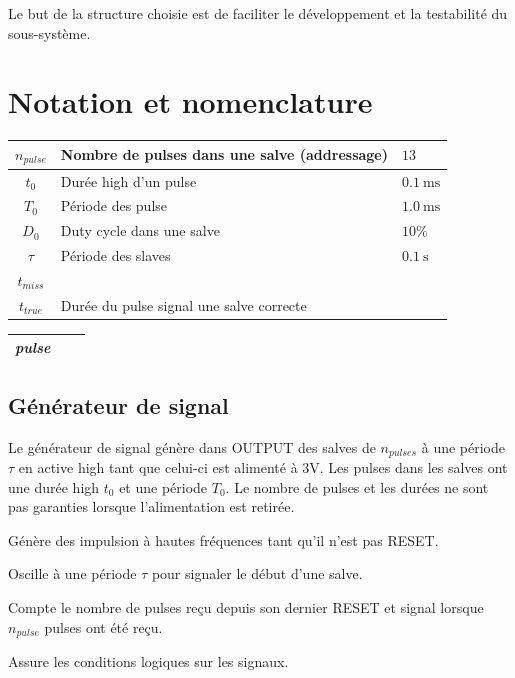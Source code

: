 \documentclass[french]{layout/Report}
\begin{document}
Le but de la structure choisie est de faciliter le développement et la testabilité
du sous-système.



\section{Notation et nomenclature}

\begin{center}
	\begin{tabular}{| c | l | l |}
		\hline
		$n_{pulse}$	& Nombre de pulses dans une salve (addressage) & $13$ \\ \hline
		$t_0$				& Durée high d'un pulse	& $\SI{0.1}{\milli\second}$	\\ \hline
		$T_0$				& Période des pulse	& $\SI{1.0}{\milli\second}$	\\ \hline
		$D_0$				& Duty cycle dans une salve & $10\%$	\\ \hline
		$\tau$			& Période des slaves	& $\SI{0.1}{\second}$\\ \hline
		$t_{miss}$  & &\\ \hline
		$t_{true}$  & Durée du pulse signal une salve correcte & \\ \hline
	\end{tabular}
\end{center}

\begin{center}
    \begin{tabular}{| c | l | c |}
			\hline
        \textit{pulse}      &  \\ \hline
    \end{tabular}
\end{center}

\subsection{Générateur de signal}
Le générateur de signal génère dans OUTPUT des salves de $n_{pulses}$ à une période $\tau$ en active high tant que celui-ci est alimenté à 3V. Les pulses dans les salves ont une durée high $t_0$ et une période $T_0$. Le nombre de pulses et les durées ne sont pas garanties lorsque l'alimentation est retirée.

\begin{description}[leftmargin=!,labelwidth=3cm, labelindent=\parindent]
	\item[Pulse timer] Génère des impulsion à hautes fréquences tant qu'il n'est pas RESET. 
	\item[Burst timer] Oscille à une période $\tau$ pour signaler le début d'une salve.
	\item[Decounter] Compte le nombre de pulses reçu depuis son dernier RESET et signal lorsque $n_{pulse}$ pulses ont été reçu.
	\item[Logic] Assure les conditions logiques sur les signaux.
\end{description}
\end{document}
